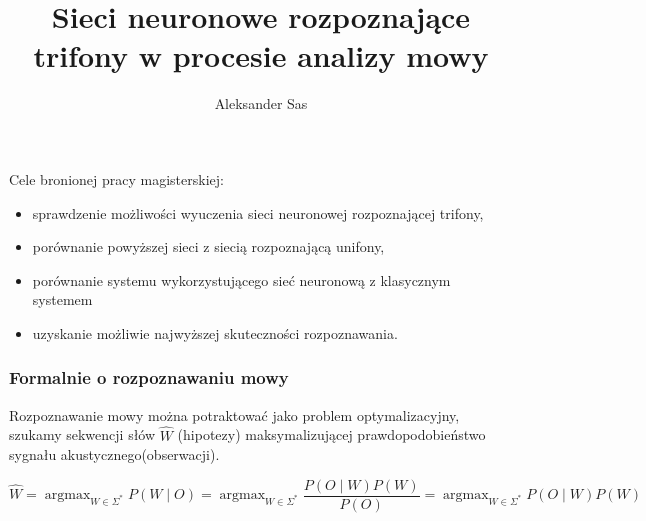 \documentclass[mathserif, serif]{beamer}
\author{Aleksander Sas}
\title{Sieci neuronowe rozpoznające trifony w procesie analizy mowy}
\DeclareMathOperator*{\argmax}{\arg\max}   %
\begin{document}
	\begin{frame}
		\titlepage
	\end{frame}

	\begin{frame}
		Cele bronionej pracy magisterskiej:
		\begin{itemize}
			\item sprawdzenie możliwości wyuczenia sieci neuronowej rozpoznającej trifony,
			\item porównanie powyższej sieci z siecią rozpoznającą unifony,
			\item porównanie systemu wykorzystującego sieć neuronową z klasycznym systemem
			\item uzyskanie możliwie najwyższej skuteczności rozpoznawania.
		\end{itemize}
	\end{frame}

	\begin{frame}
		\frametitle{Formalnie o rozpoznawaniu mowy} %
		Rozpoznawanie mowy można potraktować jako problem optymalizacyjny, szukamy sekwencji słów $\hat{W}$ (hipotezy) maksymalizującej prawdopodobieństwo sygnału akustycznego(obserwacji).
		\begin{exampleblock}{}
			\scriptsize
			\begin{equation}
				\hat{W}=\argmax_{W \in \Sigma^{*}}{P(W \mid O)} = \argmax_{W \in \Sigma^{*}}{\frac{P(O \mid W)P(W)}{P(O)}} = \argmax_{W \in \Sigma^{*}}{P(O \mid W)P(W)}
			\end{equation}
		\end{exampleblock}
		
	\end{frame}
\end{document}
